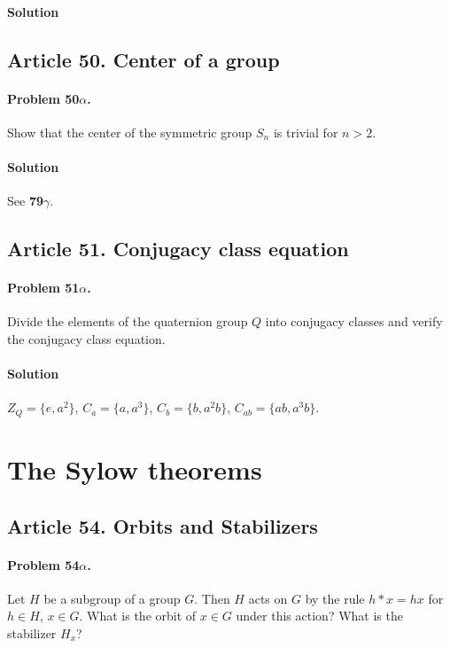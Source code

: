\paragraph*{Solution}

\subsection{Article 50. Center of a group}

\paragraph{Problem 50$\alpha$.}
Show that the center of the symmetric group $S_n$ is trivial for $n > 2$.

\paragraph*{Solution}
See \textbf{79$\gamma$}.

\subsection{Article 51. Conjugacy class equation}

\paragraph{Problem 51$\alpha$.}
Divide the elements of the quaternion group $Q$ into conjugacy classes and
verify the conjugacy class equation.

\paragraph*{Solution}
$Z_Q = \{ e, a^2 \}$, $C_a = \{ a, a^3 \}$, $C_b = \{ b, a^2 b \}$,
$C_{ab} = \{ ab, a^3b \}$.


\section{The Sylow theorems}

\subsection{Article 54. Orbits and Stabilizers}
\paragraph{Problem 54$\alpha$.}
Let $H$ be a subgroup of a group $G$. Then $H$ acts on $G$ by the rule
$h * x = hx$ for $h \in H$, $x \in G$. What is the orbit of $x \in G$ under
this action? What is the stabilizer $H_x$?

